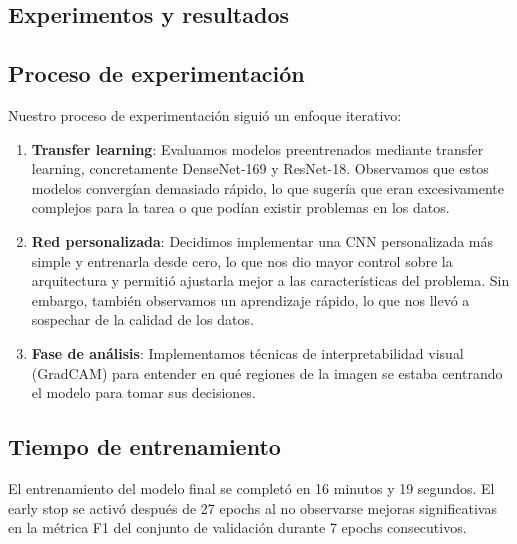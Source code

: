 \documentclass[es]{uc3mreport}
\begin{document}
\begin{report}
    \section{Experimentos y resultados}
    
    \subsection{Proceso de experimentación}
    
    Nuestro proceso de experimentación siguió un enfoque iterativo:
    
    \begin{enumerate}
        \item \textbf{Transfer learning}: Evaluamos modelos preentrenados mediante transfer learning, concretamente DenseNet-169 y ResNet-18. Observamos que estos modelos convergían demasiado rápido, lo que sugería que eran excesivamente complejos para la tarea o que podían existir problemas en los datos.
        
        \item \textbf{Red personalizada}: Decidimos implementar una CNN personalizada más simple y entrenarla desde cero, lo que nos dio mayor control sobre la arquitectura y permitió ajustarla mejor a las características del problema. Sin embargo, también observamos un aprendizaje rápido, lo que nos llevó a sospechar de la calidad de los datos.
        
        \item \textbf{Fase de análisis}: Implementamos técnicas de interpretabilidad visual (GradCAM) para entender en qué regiones de la imagen se estaba centrando el modelo para tomar sus decisiones.
    \end{enumerate}
    
    \subsection{Tiempo de entrenamiento}
    
    El entrenamiento del modelo final se completó en 16 minutos y 19 segundos. El early stop se activó después de 27 epochs al no observarse mejoras significativas en la métrica F1 del conjunto de validación durante 7 epochs consecutivos.


\end{report}
\end{document}
